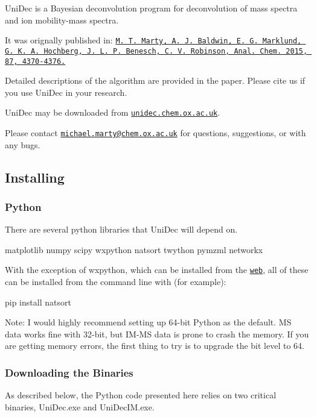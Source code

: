 Uni\+Dec is a Bayesian deconvolution program for deconvolution of mass spectra and ion mobility-\/mass spectra.

It was orignally published in\+: \href{http://pubs.acs.org/doi/abs/10.1021/acs.analchem.5b00140}{\tt M. T. Marty, A. J. Baldwin, E. G. Marklund, G. K. A. Hochberg, J. L. P. Benesch, C. V. Robinson, Anal. Chem. 2015, 87, 4370-\/4376.}

Detailed descriptions of the algorithm are provided in the paper. Please cite us if you use Uni\+Dec in your research.

Uni\+Dec may be downloaded from \href{http://unidec.chem.ox.ac.uk/}{\tt unidec.\+chem.\+ox.\+ac.\+uk}.

Please contact \href{mailto:michael.marty@chem.ox.ac.uk}{\tt michael.\+marty@chem.\+ox.\+ac.\+uk} for questions, suggestions, or with any bugs.

\subsection*{Installing}

\subsubsection*{Python}

There are several python libraries that Uni\+Dec will depend on.

matplotlib numpy scipy wxpython natsort twython pymzml networkx

With the exception of wxpython, which can be installed from the \href{http://wxpython.org/}{\tt web}, all of these can be installed from the command line with (for example)\+: \begin{DoxyVerb}pip install natsort
\end{DoxyVerb}


Note\+: I would highly recommend setting up 64-\/bit Python as the default. M\+S data works fine with 32-\/bit, but I\+M-\/\+M\+S data is prone to crash the memory. If you are getting memory errors, the first thing to try is to upgrade the bit level to 64.

\subsubsection*{Downloading the Binaries}

As described below, the Python code presented here relies on two critical binaries, Uni\+Dec.\+exe and Uni\+Dec\+I\+M.\+exe.

